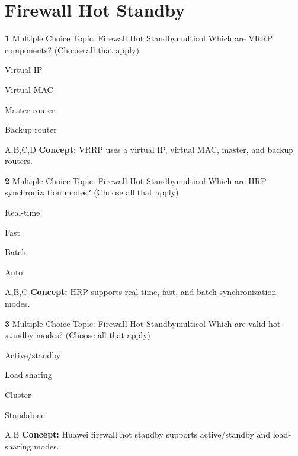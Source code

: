 \documentclass[10pt,a4paper]{article}
\begin{document}
\section{Firewall Hot Standby}
\begin{qcard}{\color{white}\textbf{1} \hfill \small Multiple Choice \textbar{} Topic: Firewall Hot Standby}{multicol}
Which are VRRP components? (Choose all that apply)

\begin{qoptions}
\item Virtual IP
\item Virtual MAC
\item Master router
\item Backup router
\end{qoptions}
\begin{explainbox}{A,B,C,D}
\textbf{Concept:} VRRP uses a virtual IP, virtual MAC, master, and backup routers.
\end{explainbox}
\end{qcard}

\begin{qcard}{\color{white}\textbf{2} \hfill \small Multiple Choice \textbar{} Topic: Firewall Hot Standby}{multicol}
Which are HRP synchronization modes? (Choose all that apply)

\begin{qoptions}
\item Real-time
\item Fast
\item Batch
\item Auto
\end{qoptions}
\begin{explainbox}{A,B,C}
\textbf{Concept:} HRP supports real-time, fast, and batch synchronization modes.
\end{explainbox}
\end{qcard}

\begin{qcard}{\color{white}\textbf{3} \hfill \small Multiple Choice \textbar{} Topic: Firewall Hot Standby}{multicol}
Which are valid hot-standby modes? (Choose all that apply)

\begin{qoptions}
\item Active/standby
\item Load sharing
\item Cluster
\item Standalone
\end{qoptions}
\begin{explainbox}{A,B}
\textbf{Concept:} Huawei firewall hot standby supports active/standby and load-sharing modes.
\end{explainbox}
\end{qcard}
\end{document}
